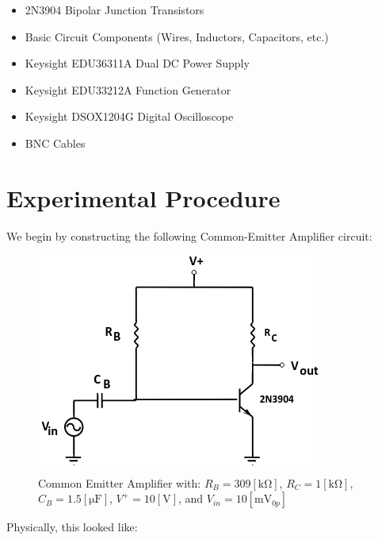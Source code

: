 \documentclass[
	letterpaper, %
	10pt, %
]{CSUniSchoolLabReport}
\begin{document}
\begin{itemize}

  \item 2N3904 Bipolar Junction Transistors

  \item Basic Circuit Components (Wires, Inductors, Capacitors, etc.)

  \item Keysight EDU36311A Dual DC Power Supply

  \item Keysight EDU33212A Function Generator

  \item Keysight DSOX1204G Digital Oscilloscope

  \item BNC Cables

\end{itemize}

\newpage

\section{Experimental Procedure}

We begin by constructing the following Common-Emitter Amplifier circuit:

\begin{figure}[H]
  \centering
  \includegraphics[width=.7\textwidth]{Figures/L4C1}
  \caption{Common Emitter Amplifier with: $R_B=309[\si{\kilo\ohm}]$, $R_C=1[\si{\kilo\ohm}]$, $C_B=1.5[\si{\micro\farad}]$, $V^+=10[\si{\volt}]$, and $V_{in}=10[\si{\milli\volt}_{0p}]$}
  \label{fig:1}
\end{figure}

Physically, this looked like:
\end{document}
